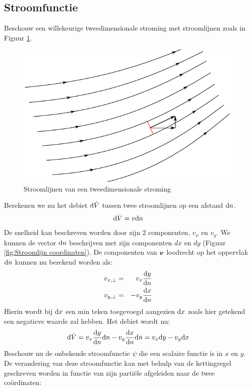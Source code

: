 		\subsection{Stroomfunctie}
Beschouw een willekeurige tweedimensionale stroming met stroomlijnen zoals in Figuur \ref{fig:Stroomfunctie}.
\begin{figure}[htb]
	\centering
	\includegraphics{fig/uitwendige_stroming/Stroomfunctie}
	\caption{Stroomlijnen van een tweedimensionale stroming}
	\label{fig:Stroomfunctie}
\end{figure}
Berekenen we nu het debiet $\mathrm{d} \dot{V}$ tussen twee stroomlijnen op een afstand $\mathrm{d} n$.
\begin{equation}
	\mathrm{d} \dot{V} = v \mathrm{d} n
\end{equation}
De snelheid kan beschreven worden door zijn 2 componenten, $v_x$ en $v_y$. We kunnen de vector $\mathrm{d} n$ beschrijven met zijn componenten $dx$ en $dy$ (Figuur \ref{fig:Stroomlijn coordinaten}). De componenten van $\boldsymbol{v}$ loodrecht op het oppervlak $\mathrm{d} n$ kunnen nu berekend worden als:
\begin{eqnarray}
	v_{x,\perp} &=&  v_x \frac{\mathrm{d} y}{\mathrm{d} n} \\
	v_{y,\perp} &=& -v_y \frac{\mathrm{d} x}{\mathrm{d} n}
\end{eqnarray}
Hierin wordt bij $\mathrm{d} x$ een min teken toegevoegd aangezien $\mathrm{d} x$ zoals hier getekend een negatieve waarde zal hebben. Het debiet wordt nu:
\begin{equation}
	\mathrm{d} \dot{V} = v_x \frac{\mathrm{d} y}{\mathrm{d} n} \mathrm{d} n - v_y \frac{\mathrm{d} x}{\mathrm{d} n} \mathrm{d} n = v_x \mathrm{d} y - v_y \mathrm{d} x
	\label{eqn:debiet tussen stroomlijnen}
\end{equation}
Beschouw nu de onbekende stroomfunctie $\psi$ die een scalaire functie is in $x$ en $y$. De verandering van deze stroomfunctie kan met behulp van de kettingregel geschreven worden in functie van zijn partiële afgeleiden naar de twee coördinaten:
